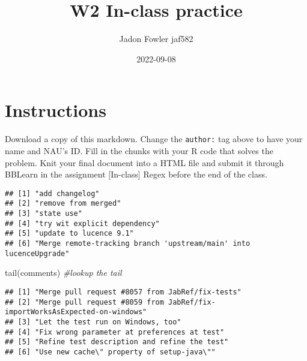 \documentclass[
]{article}
\title{W2 In-class practice}
\author{Jadon Fowler jaf582}
\date{2022-09-08}
\newenvironment{Shaded}{\begin{snugshade}}{\end{snugshade}}
\newcommand{\CommentTok}[1]{\textcolor[rgb]{0.56,0.35,0.01}{\textit{#1}}}
\newcommand{\FunctionTok}[1]{\textcolor[rgb]{0.00,0.00,0.00}{#1}}
\newcommand{\NormalTok}[1]{#1}
\newcommand{\OtherTok}[1]{\textcolor[rgb]{0.56,0.35,0.01}{#1}}
\newcommand{\SpecialCharTok}[1]{\textcolor[rgb]{0.00,0.00,0.00}{#1}}
\newcommand{\StringTok}[1]{\textcolor[rgb]{0.31,0.60,0.02}{#1}}
\begin{document}
\maketitle

\hypertarget{instructions}{%
\section{Instructions}\label{instructions}}

Download a copy of this markdown. Change the \texttt{author:} tag above
to have your name and NAU's ID. Fill in the chunks with your R code that
solves the problem. Knit your final document into a HTML file and submit
it through BBLearn in the assignment {[}In-class{]} Regex before the end
of the class.

\begin{Shaded}
\end{Shaded}

\begin{verbatim}
## [1] "add changelog"                                                   
## [2] "remove from merged"                                              
## [3] "state use"                                                       
## [4] "try wit explicit dependency"                                     
## [5] "update to lucence 9.1"                                           
## [6] "Merge remote-tracking branch 'upstream/main' into lucenceUpgrade"
\end{verbatim}

\begin{Shaded}
\begin{Highlighting}[]
\FunctionTok{tail}\NormalTok{(comments)  }\CommentTok{\#lookup the tail}
\end{Highlighting}
\end{Shaded}

\begin{verbatim}
## [1] "Merge pull request #8057 from JabRef/fix-tests"                           
## [2] "Merge pull request #8059 from JabRef/fix-importWorksAsExpected-on-windows"
## [3] "Let the test run on Windows, too"                                         
## [4] "Fix wrong parameter at preferences at test"                               
## [5] "Refine test description and refine the test"                              
## [6] "Use new cache\" property of setup-java\""
\end{verbatim}
\end{document}

